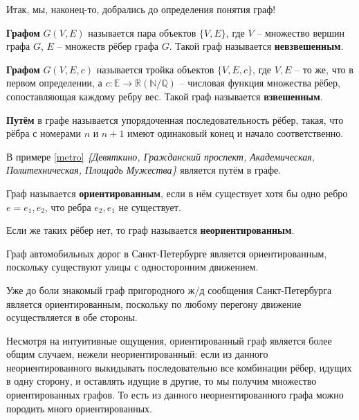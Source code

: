 Итак, мы, наконец-то, добрались до определения понятия граф!

\begin{definition}
	\textbf{Графом} $G(V, E)$ называется пара объектов $\{V, E\}$, где $V$ -- множество вершин графа $G$, $E$ -- множеств рёбер графа $G$. Такой граф называется \textbf{невзвешенным}.
\end{definition}
	
\begin{definition}
	\textbf{Графом} $G(V, E, c)$ называется тройка объектов $\{V, E, c\}$, где $V, E$ -- то же, что в первом определении, а $c: \mathbb{E} \rightarrow \mathbb{R (N/Q)}$ -- числовая функция множества рёбер, сопоставляющая каждому ребру вес. Такой граф называется \textbf{взвешенным}.
\end{definition}

\begin{definition}
	\textbf{Путём} в графе называется упорядоченная последовательность рёбер, такая, что рёбра с номерами $n$ и $n + 1$ имеют одинаковый конец и начало соответственно.
\end{definition}
\begin{example}
	В примере \ref{metro} \textit{\{Девяткино, Гражданский проспект, Академическая, Политехническая, Площадь Мужества\}} является путём в графе.
\end{example}

\begin{definition}
	Граф называется \textbf{ориентированным}, если в нём существует хотя бы одно ребро $e = {e_1, e_2}$, что ребра ${e_2, e_1}$ не существует.
\end{definition}

\begin{definition}
	Если же таких рёбер нет, то граф называется \textbf{неориентированным}.
\end{definition}

\begin{example}
	Граф автомобильных дорог в Санкт-Петербурге является ориентированным, поскольку существуют улицы с односторонним движением.
\end{example}
\begin{example}
	Уже до боли знакомый граф пригородного ж/д сообщения Санкт-Петербурга является ориентированным, поскольку по любому перегону движение осуществляется в обе стороны.
\end{example}

\begin{remark}
	Несмотря на интуитивные ощущения, ориентированный граф является более общим случаем, нежели неориентированный: если из данного неориентированного выкидывать последовательно все комбинации рёбер, идущих в одну сторону, и оставлять идущие в другие, то мы получим множество ориентированных графов. То есть из данного неориентированного графа можно породить много ориентированных.
\end{remark}

